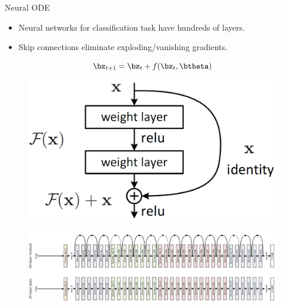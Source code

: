 \begin{frame}{Neural ODE}
	\begin{minipage}[t]{0.6\columnwidth}
	\vspace{0.2cm}
	\begin{itemize}
		\item Neural networks for classification task have hundreds of layers.
		\item Skip connections eliminate exploding/vanishing gradients.
	\end{itemize}
	\[
		\bz_{t + 1} = \bz_t + f(\bz_t, \btheta)
	\]
	\end{minipage}%
	\begin{minipage}[t]{0.4\columnwidth}
	\begin{figure}
	    \centering
	    \includegraphics[width=0.95\linewidth]{figs/resnet_1.png}
	\end{figure}
	\end{minipage}
	\begin{figure}
	    \centering
	    \includegraphics[width=\linewidth]{figs/resnet_2.png}
	\end{figure}
\end{frame}
